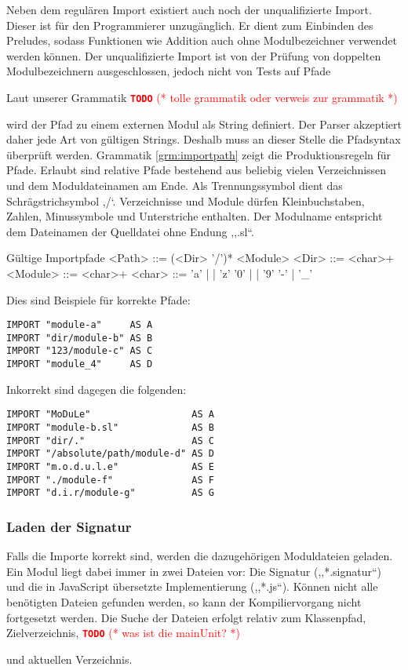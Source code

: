 \documentclass[runningheads]{llncs}
\newcommand{\TODO}[1]{ \textcolor{red}{\textbf{\texttt{\large{TODO}}} (* #1 *)}\par}
\begin{document}
Neben dem regulären Import existiert auch noch der unqualifizierte Import. Dieser ist für den Programmierer unzugänglich. Er dient zum Einbinden des Preludes, sodass Funktionen wie Addition auch ohne Modulbezeichner verwendet werden können. Der unqualifizierte Import ist von der Prüfung von doppelten Modulbezeichnern ausgeschlossen, jedoch nicht von Tests auf Pfade

Laut unserer Grammatik \TODO{tolle grammatik oder verweis zur grammatik} wird der Pfad zu einem externen Modul als String definiert. Der Parser akzeptiert daher jede Art von gültigen Strings. Deshalb muss an dieser Stelle die Pfadsyntax überprüft werden. Grammatik \ref{grm:importpath} zeigt die Produktionsregeln für Pfade. Erlaubt sind relative Pfade bestehend aus beliebig vielen Verzeichnissen und dem Moduldateinamen am Ende. Als Trennungssymbol dient das Schrägstrichsymbol ,/`. Verzeichnisse und Module dürfen Kleinbuchstaben, Zahlen, Minussymbole und Unterstriche enthalten. Der Modulname entspricht dem Dateinamen der Quelldatei ohne Endung ,,.sl``.

\begin{grammarfigure}{Gültige Importpfade}
  <Path>   ::= (<Dir> '/')* <Module>
  <Dir>    ::= <char>+
  <Module> ::= <char>+
  <char>   ::= 'a' | \cdots | 'z'
          \alt '0' | \cdots | '9'
          \alt '-' | '\_'
\end{grammarfigure}

Dies sind Beispiele für korrekte Pfade:

\begin{verbatim}
IMPORT "module-a"     AS A
IMPORT "dir/module-b" AS B
IMPORT "123/module-c" AS C
IMPORT "module_4"     AS D
\end{verbatim}

Inkorrekt sind dagegen die folgenden:

\begin{verbatim}
IMPORT "MoDuLe"                  AS A
IMPORT "module-b.sl"             AS B
IMPORT "dir/."                   AS C
IMPORT "/absolute/path/module-d" AS D
IMPORT "m.o.d.u.l.e"             AS E
IMPORT "./module-f"              AS F
IMPORT "d.i.r/module-g"          AS G
\end{verbatim}

\subsubsection{Laden der Signatur}

Falls die Importe korrekt sind, werden die dazugehörigen Moduldateien geladen. Ein Modul liegt dabei immer in zwei Dateien vor: Die Signatur (,,*.signatur``) und die in JavaScript übersetzte Implementierung  (,,*.js``). Können nicht alle benötigten Dateien gefunden werden, so kann der Kompiliervorgang nicht fortgesetzt werden. Die Suche der Dateien erfolgt relativ zum Klassenpfad, Zielverzeichnis, \TODO{was ist die mainUnit?} und aktuellen Verzeichnis.
\end{document}
